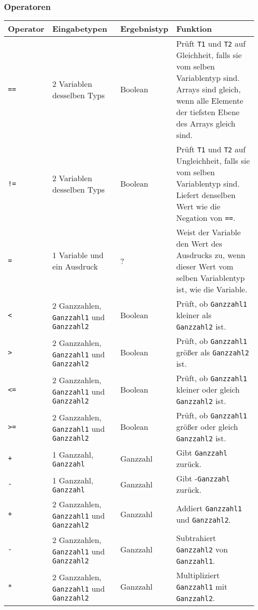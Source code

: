 \documentclass[a4paper,10pt]{article}
\begin{document}
\subsubsection{Operatoren}
\begin{tabularx}{\textwidth}{| l | X | l | X |}
\hline
\textbf{Operator} & \textbf{Eingabetypen} & \textbf{Ergebnistyp} & \textbf{Funktion}\\
\hline
\texttt{==} & 2 Variablen desselben Typs & Boolean & Pr\"{u}ft \texttt{T1} und \texttt{T2} auf Gleichheit, falls sie vom selben Variablentyp sind. Arrays sind gleich, wenn alle Elemente der tiefsten Ebene des Arrays gleich sind.\\
\texttt{!=} & 2 Variablen desselben Typs & Boolean & Pr\"{u}ft \texttt{T1} und \texttt{T2} auf Ungleichheit, falls sie vom selben Variablentyp sind. Liefert denselben Wert wie die Negation von \texttt{==}.\\
\texttt{=} & 1 Variable und ein Ausdruck & ? & Weist der Variable den Wert des Ausdrucks zu, wenn dieser Wert vom selben Variablentyp ist, wie die Variable.\\
\hline
\texttt{<} & 2 Ganzzahlen, \texttt{Ganzzahl1} und \texttt{Ganzzahl2} & Boolean & Pr\"{u}ft, ob \texttt{Ganzzahl1} kleiner als \texttt{Ganzzahl2} ist.\\
\texttt{>} & 2 Ganzzahlen, \texttt{Ganzzahl1} und \texttt{Ganzzahl2} & Boolean & Pr\"{u}ft, ob \texttt{Ganzzahl1} gr\"{o}\ss{}er als \texttt{Ganzzahl2} ist.\\
\texttt{<=} & 2 Ganzzahlen, \texttt{Ganzzahl1} und \texttt{Ganzzahl2} & Boolean & Pr\"{u}ft, ob \texttt{Ganzzahl1} kleiner oder gleich \texttt{Ganzzahl2} ist.\\
\texttt{>=} & 2 Ganzzahlen, \texttt{Ganzzahl1} und \texttt{Ganzzahl2} & Boolean & Pr\"{u}ft, ob \texttt{Ganzzahl1} gr\"{o}\ss{}er oder gleich \texttt{Ganzzahl2} ist.\\
\texttt{+} & 1 Ganzzahl, \texttt{Ganzzahl} & Ganzzahl & Gibt \texttt{Ganzzahl} zur\"{u}ck.\\
\texttt{-} & 1 Ganzzahl, \texttt{Ganzzahl} & Ganzzahl & Gibt -\texttt{Ganzzahl} zur\"{u}ck.\\
\texttt{+} & 2 Ganzzahlen, \texttt{Ganzzahl1} und \texttt{Ganzzahl2} & Ganzzahl & Addiert \texttt{Ganzzahl1} und \texttt{Ganzzahl2}.\\
\texttt{-} & 2 Ganzzahlen, \texttt{Ganzzahl1} und \texttt{Ganzzahl2} & Ganzzahl & Subtrahiert \texttt{Ganzzahl2} von \texttt{Ganzzahl1}.\\
\texttt{*} & 2 Ganzzahlen, \texttt{Ganzzahl1} und \texttt{Ganzzahl2} & Ganzzahl & Multipliziert \texttt{Ganzzahl1} mit \texttt{Ganzzahl2}.\\

\end{tabularx}
\end{document}
